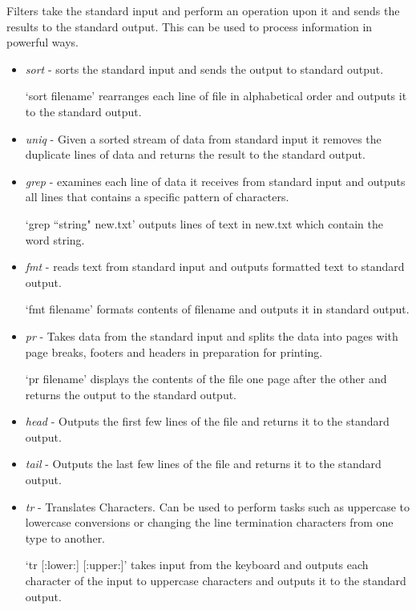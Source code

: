 \documentclass{article}
\begin{document}
Filters take the standard input and perform an operation upon it and sends the results to the standard output. This can be used to process information in powerful ways.
\begin{itemize}
\item \textit{sort} - sorts the standard input and sends the output to standard output.

\hspace{10mm} `sort filename' rearranges each line of file in alphabetical order and outputs it to the standard output.

\item \textit{uniq} - Given a sorted stream of data from standard input it removes the duplicate lines of data and returns the result to the standard output.

\item \textit{grep} - examines each line of data it receives from standard input and outputs all lines that contains a specific pattern of characters.

\hspace{10mm} `grep ``string" new.txt' outputs lines of text in new.txt which contain the word string.

\item \textit{fmt} - reads text from standard input and outputs formatted text to standard output.

\hspace{10mm} `fmt filename' formats contents of filename and outputs it in standard output.

\item \textit{pr} - Takes data from the standard input and splits the data into pages with page breaks, footers and headers in preparation for printing.

\hspace{10mm} `pr filename' displays the contents of the file one page after the other and returns the output to the standard output.

\item \textit{head} - Outputs the first few lines of the file and returns it to the standard output.

\item \textit{tail} - Outputs the last few lines of the file and returns it to the standard output.

\item \textit{tr} - Translates Characters. Can be used to perform tasks such as uppercase to lowercase conversions or changing the line termination characters from one type to another.

\hspace{10mm} `tr [:lower:] [:upper:]' takes input from the keyboard and outputs each character of the input to uppercase characters and outputs it to the standard output.

\end{itemize}
\end{document}
